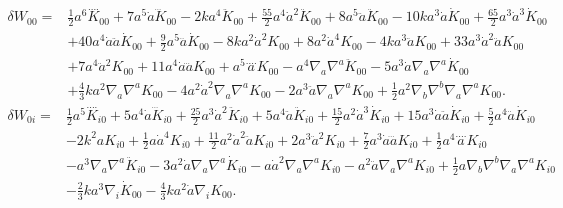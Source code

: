 \documentclass[10pt,letterpaper]{article}
\begin{document}
\begin{align}
\delta W_{00}={}&\tfrac{1}{2} a^6 \overset{\text{...}.}{K}_{00}
 + 7 a^5 \dot{a} \dddot{K}_{00}
 - 2 k a^4 \ddot{K}_{00}
 + \tfrac{55}{2} a^4 \dot{a}^2 \ddot{K}_{00}
 + 8 a^5 \ddot{a} \ddot{K}_{00}
 - 10 k a^3 \dot{a} \dot{K}_{00}
 + \tfrac{65}{2} a^3 \dot{a}^3 \dot{K}_{00}\nonumber\\
& + 40 a^4 \dot{a} \ddot{a} \dot{K}_{00}
 + \tfrac{9}{2} a^5 \dddot{a} \dot{K}_{00}
 - 8 k a^2 \dot{a}^2 K_{00}
 + 8 a^2 \dot{a}^4 K_{00}
 - 4 k a^3 \ddot{a} K_{00}
 + 33 a^3 \dot{a}^2 \ddot{a} K_{00}\nonumber\\
& + 7 a^4 \ddot{a}^2 K_{00}
 + 11 a^4 \dot{a} \dddot{a} K_{00}
 + a^5 \overset{\text{...}.}{a} K_{00}
 -  a^4 \nabla_{a}\nabla^{a}\ddot{K}_{00}
 - 5 a^3 \dot{a} \nabla_{a}\nabla^{a}\dot{K}_{00}\nonumber\\
& + \tfrac{4}{3} k a^2 \nabla_{a}\nabla^{a}K_{00}
 - 4 a^2 \dot{a}^2 \nabla_{a}\nabla^{a}K_{00}
 - 2 a^3 \ddot{a} \nabla_{a}\nabla^{a}K_{00}
 + \tfrac{1}{2} a^2 \nabla_{b}\nabla^{b}\nabla_{a}\nabla^{a}K_{00}.
\end{align}
\begin{align}
\delta W_{0i}={}&\tfrac{1}{2} a^5 \overset{\text{...}.}{K}_{i0}
 + 5 a^4 \dot{a} \dddot{K}_{i0}
 + \tfrac{25}{2} a^3 \dot{a}^2 \ddot{K}_{i0}
 + 5 a^4 \ddot{a} \ddot{K}_{i0}
 + \tfrac{15}{2} a^2 \dot{a}^3 \dot{K}_{i0}
 + 15 a^3 \dot{a} \ddot{a} \dot{K}_{i0}
 + \tfrac{5}{2} a^4 \dddot{a} \dot{K}_{i0}\nonumber\\
& - 2 k^2 a K_{i0}
 + \tfrac{1}{2} a \dot{a}^4 K_{i0}
 + \tfrac{11}{2} a^2 \dot{a}^2 \ddot{a} K_{i0}
 + 2 a^3 \ddot{a}^2 K_{i0}
 + \tfrac{7}{2} a^3 \dot{a} \dddot{a} K_{i0}
 + \tfrac{1}{2} a^4 \overset{\text{...}.}{a} K_{i0}\nonumber\\
& -  a^3 \nabla_{a}\nabla^{a}\ddot{K}_{i0}
 - 3 a^2 \dot{a} \nabla_{a}\nabla^{a}\dot{K}_{i0}
 -  a \dot{a}^2 \nabla_{a}\nabla^{a}K_{i0}
 -  a^2 \ddot{a} \nabla_{a}\nabla^{a}K_{i0}
 + \tfrac{1}{2} a \nabla_{b}\nabla^{b}\nabla_{a}\nabla^{a}K_{i0}\nonumber\\
& -  \tfrac{2}{3} k a^3 \nabla_{i}\dot{K}_{00}
 -  \tfrac{4}{3} k a^2 \dot{a} \nabla_{i}K_{00}.
\end{align}
\end{document}
